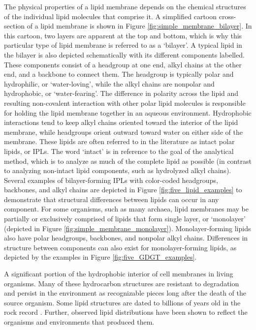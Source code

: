The physical properties of a lipid membrane depends on the chemical structures of the individual lipid molecules that comprise it. A simplified cartoon cross-section of a lipid membrane is shown in Figure \ref{fig:simple_membrane_bilayer}. In this cartoon, two layers are apparent at the top and bottom, which is why this particular type of lipid membrane is referred to as a `bilayer'. A typical lipid in the bilayer is also depicted schematically with its different components labelled. These components consist of a headgroup at one end, alkyl chains at the other end, and a backbone to connect them. The headgroup is typically polar and hydrophilic, or `water-loving', while the alkyl chains are nonpolar and hydrophobic, or `water-fearing'. The difference in polarity across the lipid and resulting non-covalent interaction with other polar lipid molecules is responsible for holding the lipid membrane together in an aqueous environment. Hydrophobic interactions tend to keep alkyl chains oriented toward the interior of the lipid membrane, while headgroups orient outward toward water on either side of the membrane. These lipids are often referred to in the literature as intact polar lipids, or IPLs. The word `intact' is in reference to the goal of the analytical method, which is to analyze as much of the complete lipid as possible (in contrast to analyzing non-intact lipid components, such as hydrolyzed alkyl chains). Several examples of bilayer-forming IPLs with color-coded headgroups, backbones, and alkyl chains are depicted in Figure \ref{fig:five_lipid_examples} to demonstrate that structural differences between lipids can occur in any component. For some organisms, such as many archaea, lipid membranes may be partially or exclusively comprised of lipids that form single layer, or `monolayer' (depicted in Figure \ref{fig:simple_membrane_monolayer}). Monolayer-forming lipids also have polar headgroups, backbones, and nonpolar alkyl chains. Differences in structure between components can also exist for monolayer-forming lipids, as depicted by the examples in Figure \ref{fig:five_GDGT_examples}.

A significant portion of the hydrophobic interior of cell membranes in living organisms. Many of these hydrocarbon structures are resistant to degradation and persist in the environment as recognizable pieces long after the death of the source organism. Some lipid structures are dated to billions of years old in the rock record \citep{brocks2003composition, brocks2003reconstruction}. Further, observed lipid distributions have been shown to reflect the organisms and environments that produced them. %

